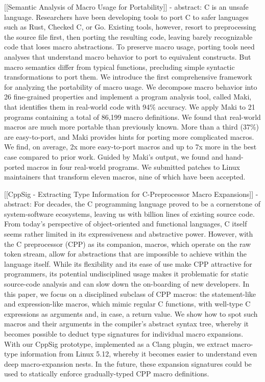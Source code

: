 [[Semantic Analysis of Macro Usage for Portability]]
 - abstract: C is an unsafe language. Researchers have been developing tools to port C to safer languages such as Rust, Checked C, or Go. Existing tools, however, resort to preprocessing the source file first, then porting the resulting code, leaving barely recognizable code that loses macro abstractions. To preserve macro usage, porting tools need analyses that understand macro behavior to port to equivalent constructs. But macro semantics differ from typical functions, precluding simple syntactic transformations to port them. We introduce the first comprehensive framework for analyzing the portability of macro usage. We decompose macro behavior into 26 fine-grained properties and implement a program analysis tool, called Maki, that identifies them in real-world code with 94\% accuracy. We apply Maki to 21 programs containing a total of 86,199 macro definitions. We found that real-world macros are much more portable than previously known. More than a third (37\%) are easy-to-port, and Maki provides hints for porting more complicated macros. We find, on average, 2x more easy-to-port macros and up to 7x more in the best case compared to prior work. Guided by Maki's output, we found and hand-ported macros in four real-world programs. We submitted patches to Linux maintainers that transform eleven macros, nine of which have been accepted.

[[CppSig - Extracting Type Information for C-Preprocessor Macro Expansions]]
- abstract: For decades, the C programming language proved to be a cornerstone of system-software ecosystems, leaving us with billion lines of existing source code. From today's perspective of object-oriented and functional languages, C itself seems rather limited in its expressiveness and abstractive power. However, with the C preprocessor (CPP) as its companion, macros, which operate on the raw token stream, allow for abstractions that are impossible to achieve within the language itself. While its flexibility and its ease of use make CPP attractive for programmers, its potential undisciplined usage makes it problematic for static source-code analysis and can slow down the on-boarding of new developers.
In this paper, we focus on a disciplined subclass of CPP macros: the statement-like and expression-like macros, which mimic regular C functions, with well-type C expressions as arguments and, in case, a return value. We show how to spot such macros and their arguments in the compiler's abstract syntax tree, whereby it becomes possible to deduct type signatures for individual macro expansions. With our CppSig prototype, implemented as a Clang plugin, we extract macro-type information from Linux 5.12, whereby it becomes easier to understand even deep macro-expansion nests. In the future, these expansion signatures could be used to statically enforce gradually-typed CPP macro definitions.

